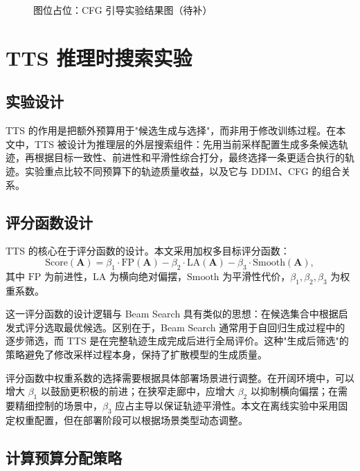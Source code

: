 \begin{figure}[htbp]
    \centering
    \fbox{\rule{0pt}{52mm}\rule{0.84\linewidth}{0pt}}
    \caption{图位占位：CFG 引导实验结果图（待补）}
    \label{fig:algo-cfg-placeholder}
\end{figure}

\section{TTS 推理时搜索实验}

\subsection{实验设计}

TTS 的作用是把额外预算用于"候选生成与选择"，而非用于修改训练过程\cite{ttsdiffusion2025,ttssearch2025}。在本文中，TTS 被设计为推理层的外层搜索组件：先用当前采样配置生成多条候选轨迹，再根据目标一致性、前进性和平滑性综合打分，最终选择一条更适合执行的轨迹。实验重点比较不同预算下的轨迹质量收益，以及它与 DDIM、CFG 的组合关系。

\subsection{评分函数设计}

TTS 的核心在于评分函数的设计。本文采用加权多目标评分函数：
\begin{equation}
\text{Score}(\mathbf{A}) = \beta_1 \cdot \text{FP}(\mathbf{A}) - \beta_2 \cdot \text{LA}(\mathbf{A}) - \beta_3 \cdot \text{Smooth}(\mathbf{A}),
\end{equation}
其中 $\text{FP}$ 为前进性，$\text{LA}$ 为横向绝对偏摆，$\text{Smooth}$ 为平滑性代价，$\beta_1, \beta_2, \beta_3$ 为权重系数。

这一评分函数的设计逻辑与 Beam Search 具有类似的思想：在候选集合中根据启发式评分选取最优候选。区别在于，Beam Search 通常用于自回归生成过程中的逐步筛选，而 TTS 是在完整轨迹生成完成后进行全局评价。这种"生成后筛选"的策略避免了修改采样过程本身，保持了扩散模型的生成质量。

评分函数中权重系数的选择需要根据具体部署场景进行调整。在开阔环境中，可以增大 $\beta_1$ 以鼓励更积极的前进；在狭窄走廊中，应增大 $\beta_2$ 以抑制横向偏摆；在需要精细控制的场景中，$\beta_3$ 应占主导以保证轨迹平滑性。本文在离线实验中采用固定权重配置，但在部署阶段可以根据场景类型动态调整。

\subsection{计算预算分配策略}


